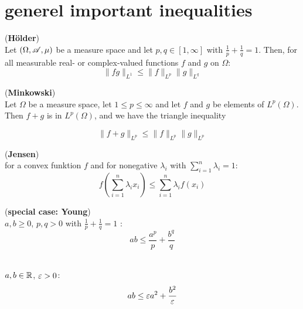 \section{generel important inequalities}

\begin{theorem}(\textbf{H\"older})\\
	Let $(\Omega, \mathscr{A}, \mu)$ be a measure space and let $p, q \in [1, \infty]$ with $\frac{1}{p} + \frac{1}{q} = 1$. Then, for all measurable real- or complex-valued functions $f$ and $g$ on $\Omega$:
	\begin{equation*}
		\|fg\|_{L^1} \leq \|f\|_{L^p} \|g\|_{L^q}
	\end{equation*}
\end{theorem}


\begin{theorem}(\textbf{Minkowski})\\
	 Let $\Omega$ be a measure space, let $1 \leq p \leq \infty$ and let $f$ and $g$ be elements of $L^p(\Omega)$. Then $f + g$ is in $L^p(\Omega)$, and we have the triangle inequality

	\begin{equation*}
	\|f+g\|_{L^p} \leq \|f\|_{L^p} \|g\|_{L^p}
	\end{equation*}
\end{theorem}


\begin{theorem}(\textbf{Jensen})\\
	for a convex funktion $f$ and for nonegative $\lambda_i$ with $\sum_{i = 1}^n \lambda_i = 1$: 
	\begin{equation*}
	f \left( \displaystyle \sum_{i=1}^{n} \lambda_i x_i \right) \leq \displaystyle \sum_{i=1}^{n} \lambda_i f(x_i)
	\end{equation*}
\end{theorem}

\begin{theorem}(\textbf{special case: Young})\\
	$a,b \geq 0$, $p,q > 0$ with $\frac{1}{p} + \frac{1}{q} = 1$ :
	\begin{equation*}
	ab \leq \frac{a^p}{p} + \frac{b^q}{q}
	\end{equation*}
\end{theorem}

\begin{theorem}\ \\
	$a,b \in \mathbb{R}$, $\varepsilon > 0$:
	\begin{equation*}
	ab \leq \varepsilon a^2 + \frac{b^2}{\varepsilon}
	\end{equation*}
\end{theorem}